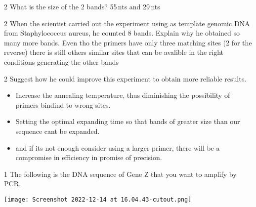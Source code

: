 \documentclass[\mainfilename]{subfiles}
\begin{document}
\begin{questionBox}2{ %
    What is the size of the 2 bands?
} %
    55\,nts and 29\,nts
\end{questionBox}

\begin{questionBox}2{ %
    When the scientist carried out the experiment using as template genomic DNA from Staphylococcus aureus, he counted 8 bands. Explain why he obtained so many more bands.
} %
    Even tho the primers have only three matching sites (2 for the reverse) there is still others similar sites that can be avalible in the right conditions generating the other bands
\end{questionBox}

\begin{questionBox}2{ %
    Suggest how he could improve this experiment to obtain more reliable results.
} %
    \vspace{-4ex}
    \begin{itemize}
        \item Increase the annealing temperature, thus diminishing the possibility of primers bindind to wrong sites.
        \item Setting the optimal expanding time so that bands of greater size than our sequence cant be expanded.
        \item and if its not enough consider using a larger primer, there will be a compromise in efficiency in promise of precision.
    \end{itemize}
\end{questionBox}

\begin{questionBox}1{ %
    The following is the DNA sequence of Gene Z that you want to amplify by PCR.
} %
    \vspace{-5ex}
    \begin{center}
        \texttt{[image: Screenshot 2022-12-14 at 16.04.43-cutout.png]}
    \end{center}
\end{questionBox}
\end{document}
